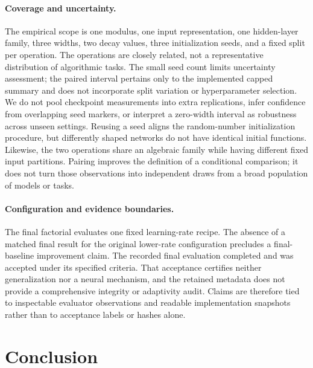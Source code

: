 \documentclass{article}
\begin{document}
\paragraph{Coverage and uncertainty.}
The empirical scope is one modulus, one input representation, one hidden-layer family, three widths, two decay values, three initialization seeds, and a fixed split per operation. The operations are closely related, not a representative distribution of algorithmic tasks. The small seed count limits uncertainty assessment; the paired interval pertains only to the implemented capped summary and does not incorporate split variation or hyperparameter selection. We do not pool checkpoint measurements into extra replications, infer confidence from overlapping seed markers, or interpret a zero-width interval as robustness across unseen settings. Reusing a seed aligns the random-number initialization procedure, but differently shaped networks do not have identical initial functions. Likewise, the two operations share an algebraic family while having different fixed input partitions. Pairing improves the definition of a conditional comparison; it does not turn those observations into independent draws from a broad population of models or tasks.

\paragraph{Configuration and evidence boundaries.}
The final factorial evaluates one fixed learning-rate recipe. The absence of a matched final result for the original lower-rate configuration precludes a final-baseline improvement claim. The recorded final evaluation completed and was accepted under its specified criteria. That acceptance certifies neither generalization nor a neural mechanism, and the retained metadata does not provide a comprehensive integrity or adaptivity audit. Claims are therefore tied to inspectable evaluator observations and readable implementation snapshots rather than to acceptance labels or hashes alone.

\section{Conclusion}
\end{document}
